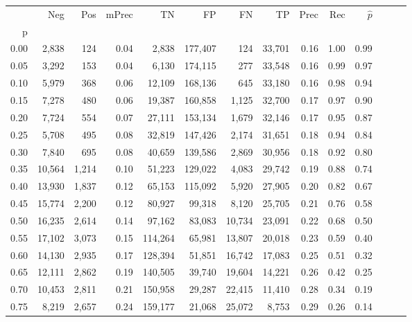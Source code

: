 \begin{tabular}{rrrrrrrrrrrrrr}
\toprule
{} &     Neg &    Pos & mPrec &       TN &       FP &      FN &      TP &  Prec &   Rec & $\hat{p}$ \\
p    &         &        &       &          &          &         &         &       &       &           \\
\midrule
0.00 &   2,838 &    124 &  0.04 &    2,838 &  177,407 &     124 &  33,701 &  0.16 &  1.00 &      0.99 \\
0.05 &   3,292 &    153 &  0.04 &    6,130 &  174,115 &     277 &  33,548 &  0.16 &  0.99 &      0.97 \\
0.10 &   5,979 &    368 &  0.06 &   12,109 &  168,136 &     645 &  33,180 &  0.16 &  0.98 &      0.94 \\
0.15 &   7,278 &    480 &  0.06 &   19,387 &  160,858 &   1,125 &  32,700 &  0.17 &  0.97 &      0.90 \\
0.20 &   7,724 &    554 &  0.07 &   27,111 &  153,134 &   1,679 &  32,146 &  0.17 &  0.95 &      0.87 \\
0.25 &   5,708 &    495 &  0.08 &   32,819 &  147,426 &   2,174 &  31,651 &  0.18 &  0.94 &      0.84 \\
0.30 &   7,840 &    695 &  0.08 &   40,659 &  139,586 &   2,869 &  30,956 &  0.18 &  0.92 &      0.80 \\
0.35 &  10,564 &  1,214 &  0.10 &   51,223 &  129,022 &   4,083 &  29,742 &  0.19 &  0.88 &      0.74 \\
0.40 &  13,930 &  1,837 &  0.12 &   65,153 &  115,092 &   5,920 &  27,905 &  0.20 &  0.82 &      0.67 \\
0.45 &  15,774 &  2,200 &  0.12 &   80,927 &   99,318 &   8,120 &  25,705 &  0.21 &  0.76 &      0.58 \\
0.50 &  16,235 &  2,614 &  0.14 &   97,162 &   83,083 &  10,734 &  23,091 &  0.22 &  0.68 &      0.50 \\
0.55 &  17,102 &  3,073 &  0.15 &  114,264 &   65,981 &  13,807 &  20,018 &  0.23 &  0.59 &      0.40 \\
0.60 &  14,130 &  2,935 &  0.17 &  128,394 &   51,851 &  16,742 &  17,083 &  0.25 &  0.51 &      0.32 \\
0.65 &  12,111 &  2,862 &  0.19 &  140,505 &   39,740 &  19,604 &  14,221 &  0.26 &  0.42 &      0.25 \\
0.70 &  10,453 &  2,811 &  0.21 &  150,958 &   29,287 &  22,415 &  11,410 &  0.28 &  0.34 &      0.19 \\
0.75 &   8,219 &  2,657 &  0.24 &  159,177 &   21,068 &  25,072 &   8,753 &  0.29 &  0.26 &      0.14 \\

\end{tabular}

